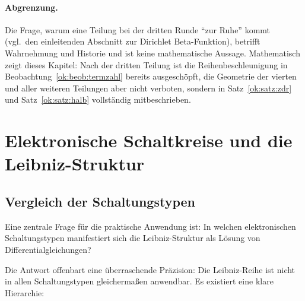 \documentclass[a4paper,12pt,twoside]{report}
\theoremstyle{definition}
\begin{document}
\paragraph{Abgrenzung.}
Die Frage, warum eine Teilung bei der dritten Runde ``zur Ruhe'' kommt (vgl.\ den einleitenden Abschnitt zur Dirichlet Beta-Funktion), betrifft Wahrnehmung und Historie und ist keine mathematische Aussage. Mathematisch zeigt dieses Kapitel: Nach der dritten Teilung ist die Reihenbeschleunigung in Beobachtung~\ref{ok:beob:termzahl} bereits ausgeschöpft, die Geometrie der vierten und aller weiteren Teilungen aber nicht verboten, sondern in Satz~\ref{ok:satz:zdr} und Satz~\ref{ok:satz:halb} vollständig mitbeschrieben.

\section{Elektronische Schaltkreise und die Leibniz-Struktur}

\subsection{Vergleich der Schaltungstypen}

Eine zentrale Frage für die praktische Anwendung ist: In welchen elektronischen Schaltungstypen manifestiert sich die Leibniz-Struktur als Lösung von Differentialgleichungen? 

Die Antwort offenbart eine überraschende Präzision: Die Leibniz-Reihe ist nicht in allen Schaltungstypen gleichermaßen anwendbar. Es existiert eine klare Hierarchie:
\end{document}
